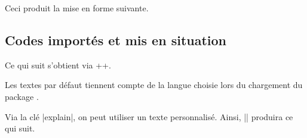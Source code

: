 

\begin{tdocexa}
    \leavevmode

    \begin{tdoclatex}[code]
    \end{tdoclatex}

    Ceci produit la mise en forme suivante.

\end{tdocexa}




\subsection{Codes importés et mis en situation} \label{tdoc-latexshow}

\begin{tdocexa}[Showcase]
    Ce qui suit s'obtient via \tdocinlatex++.

    \medskip

    \begin{tdoc-doc-showcase}
    \end{tdoc-doc-showcase}
\end{tdocexa}


\begin{tdocnote}
    Les textes par défaut tiennent compte de la langue choisie lors du chargement du package .
\end{tdocnote}




\begin{tdocexa}
    Via la clé \tdocinlatex|explain|, on peut utiliser un texte personnalisé. Ainsi, \tdocinlatex|| produira ce qui suit.

    \medskip

    \begin{tdoc-doc-showcase}
    \end{tdoc-doc-showcase}
\end{tdocexa}




